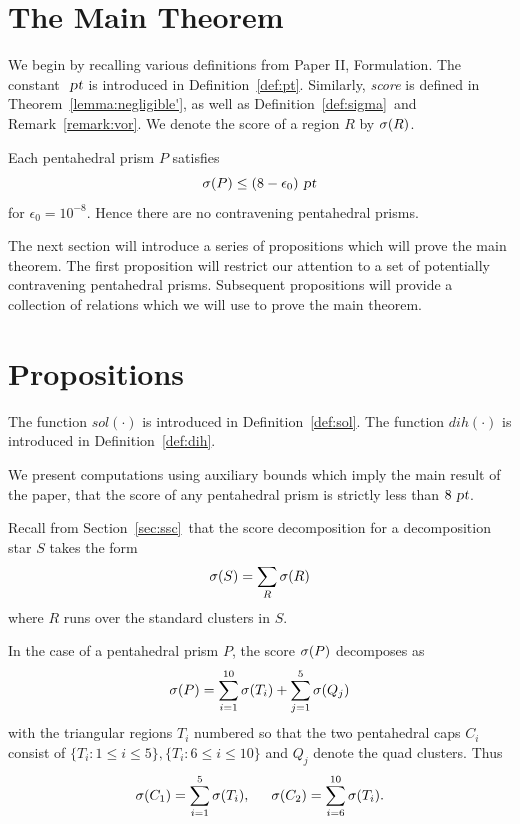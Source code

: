 

\section{The Main Theorem}
\label{sec:dabound} We begin by recalling various definitions from
Paper II, Formulation.  The constant $\text{ \sl pt}$ is introduced in
Definition~\ref{def:pt}\tomcite.  Similarly, {\em score} is defined
in Theorem~\ref{lemma:negligible'}\tomcite, as well as
Definition~\ref{def:sigma}\tomcite\ and
Remark~\ref{remark:vor}\tomcite. We denote the score of a region $R$
by $\operatorname{\sigma}(R)$.

\begin{thm}
\label{thm:dabound}
Each pentahedral prism $P$ satisfies
\[\operatorname{\sigma}(P) \le (8 - \epsilon_0) \text{ \sl pt}\]
for $\epsilon_0 = 10^{-8}$.  Hence there are no contravening pentahedral prisms.
\end{thm}

The next section will introduce a series of propositions which will prove the main theorem.
The first proposition will restrict our attention to a set of potentially contravening pentahedral prisms.
Subsequent propositions  will provide a collection of relations which we will use to prove the main theorem.

\section{Propositions}
\label{sec:props} The function $sol(\cdot)$ is introduced in
Definition~\ref{def:sol}\tomcite.  The function $dih(\cdot)$ is
introduced in Definition~\ref{def:dih}\tomcite.

We present computations using auxiliary bounds
which imply the main result of the paper, that the
score of any pentahedral prism is strictly less than $8 \text{ \sl pt}$.

Recall from Section~\ref{sec:ssc}\tomcite\ that the score
decomposition for a decomposition star $S$ takes the form
\[\operatorname{\sigma}(S) = \sum_R\operatorname{\sigma}(R)\]
where $R$ runs over the standard clusters in $S$.

In the case of a pentahedral prism $P$, the score $\operatorname{\sigma}(P)$ decomposes
as
\[\operatorname{\sigma}(P) = \sum_{i=1}^{10}\operatorname{\sigma}(T_i) + \sum_{j=1}^5\operatorname{\sigma}(Q_j)\]
with the triangular regions $T_i$ numbered so that the two pentahedral
caps $C_i$ consist of $\{T_i: 1 \le i \le 5\}, \{T_i : 6 \le i \le 10\}$ and $Q_j$ denote
the quad clusters.  Thus
\[ \operatorname{\sigma}(C_1) = \sum_{i=1}^5 \operatorname{\sigma}(T_i), \text{ \ \ \ } \operatorname{\sigma}(C_2) = \sum_{i=6}^{10} \operatorname{\sigma}(T_i).\]

